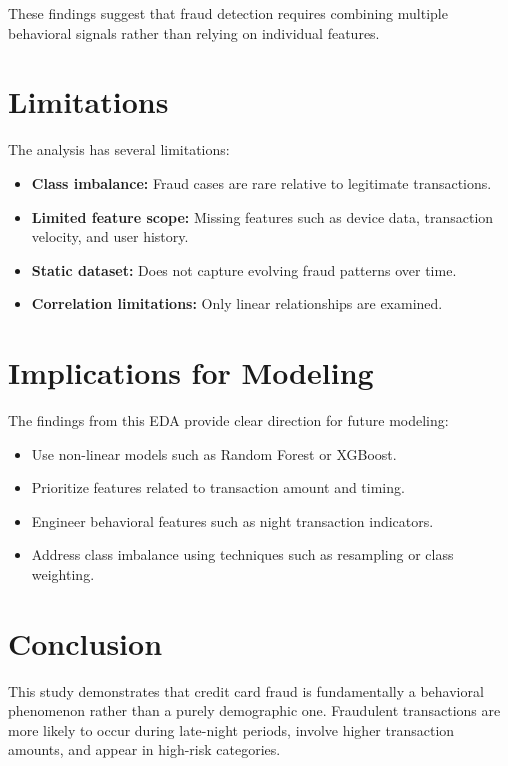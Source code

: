 \documentclass[conference]{IEEEtran}
\begin{document}
These findings suggest that fraud detection requires combining multiple behavioral signals rather than relying on individual features.

\section{Limitations}

The analysis has several limitations:

\begin{itemize}
    \item \textbf{Class imbalance:} Fraud cases are rare relative to legitimate transactions.
    \item \textbf{Limited feature scope:} Missing features such as device data, transaction velocity, and user history.
    \item \textbf{Static dataset:} Does not capture evolving fraud patterns over time.
    \item \textbf{Correlation limitations:} Only linear relationships are examined.
\end{itemize}

\section{Implications for Modeling}

The findings from this EDA provide clear direction for future modeling:

\begin{itemize}
    \item Use non-linear models such as Random Forest or XGBoost.
    \item Prioritize features related to transaction amount and timing.
    \item Engineer behavioral features such as night transaction indicators.
    \item Address class imbalance using techniques such as resampling or class weighting.
\end{itemize}

\section{Conclusion}

This study demonstrates that credit card fraud is fundamentally a behavioral phenomenon rather than a purely demographic one. Fraudulent transactions are more likely to occur during late-night periods, involve higher transaction amounts, and appear in high-risk categories.
\end{document}
